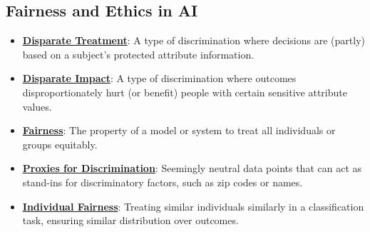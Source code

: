 \documentclass{article}%
\begin{document}
%
\subsection{Fairness and Ethics in AI}%
\label{subsec:FairnessandEthicsinAI}%
\begin{itemize}[leftmargin=*]%
\item \href{https://purdue.brightspace.com/d2l/common/assets/pdfjs-d2l-dist/1.0.14-legacy/web/viewer.html?file=\%2Fcontent\%2Fenforced\%2F1095467-wl.202510.CS.24300.001\%2F16L2-ethics.pdf\%3Fou\%3D1095467\&lang=en-us\&container=d2l-fileviewer-rendered-pdf\&fullscreen=d2l-fileviewer-rendered-pdf-dialog\&height=667#page=19}{\textbf{Disparate Treatment}}: A type of discrimination where decisions are (partly) based on a subject's protected attribute information.%
\item \href{https://purdue.brightspace.com/d2l/common/assets/pdfjs-d2l-dist/1.0.14-legacy/web/viewer.html?file=\%2Fcontent\%2Fenforced\%2F1095467-wl.202510.CS.24300.001\%2F16L2-ethics.pdf\%3Fou\%3D1095467\&lang=en-us\&container=d2l-fileviewer-rendered-pdf\&fullscreen=d2l-fileviewer-rendered-pdf-dialog\&height=667#page=19}{\textbf{Disparate Impact}}: A type of discrimination where outcomes disproportionately hurt (or benefit) people with certain sensitive attribute values.%
\item \href{https://purdue.brightspace.com/d2l/common/assets/pdfjs-d2l-dist/1.0.14-legacy/web/viewer.html?file=\%2Fcontent\%2Fenforced\%2F1095467-wl.202510.CS.24300.001\%2F16L2-ethics.pdf\%3Fou\%3D1095467\&lang=en-us\&container=d2l-fileviewer-rendered-pdf\&fullscreen=d2l-fileviewer-rendered-pdf-dialog\&height=667#page=2}{\textbf{Fairness}}: The property of a model or system to treat all individuals or groups equitably.%
\item \href{https://purdue.brightspace.com/d2l/common/assets/pdfjs-d2l-dist/1.0.14-legacy/web/viewer.html?file=\%2Fcontent\%2Fenforced\%2F1095467-wl.202510.CS.24300.001\%2F16L2-ethics.pdf\%3Fou\%3D1095467\&lang=en-us\&container=d2l-fileviewer-rendered-pdf\&fullscreen=d2l-fileviewer-rendered-pdf-dialog\&height=667#page=13}{\textbf{Proxies for Discrimination}}: Seemingly neutral data points that can act as stand-ins for discriminatory factors, such as zip codes or names.%
\item \href{https://purdue.brightspace.com/d2l/common/assets/pdfjs-d2l-dist/1.0.14-legacy/web/viewer.html?file=\%2Fcontent\%2Fenforced\%2F1095467-wl.202510.CS.24300.001\%2F16L2-ethics.pdf\%3Fou\%3D1095467\&lang=en-us\&container=d2l-fileviewer-rendered-pdf\&fullscreen=d2l-fileviewer-rendered-pdf-dialog\&height=667#page=27}{\textbf{Individual Fairness}}: Treating similar individuals similarly in a classification task, ensuring similar distribution over outcomes.%

\end{itemize}
\end{document}
